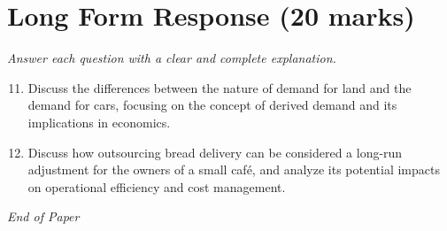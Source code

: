 \documentclass[12pt]{article}
\begin{document}
\section*{Long Form Response (20 marks)}
\textit{Answer each question with a clear and complete explanation.}
\begin{enumerate}[label=\arabic*.]
\setcounter{enumi}{10}
\item Discuss the differences between the nature of demand for land and the demand for cars, focusing on the concept of derived demand and its implications in economics.
\item Discuss how outsourcing bread delivery can be considered a long-run adjustment for the owners of a small café, and analyze its potential impacts on operational efficiency and cost management.
\end{enumerate}

\vfill
\noindent\textit{End of Paper}
\end{document}
